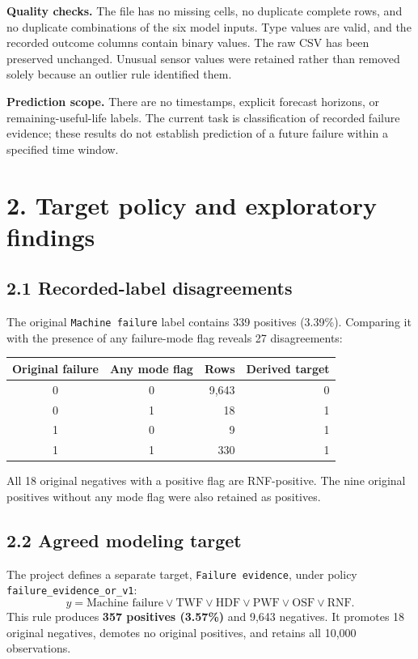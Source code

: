 \documentclass[11pt,a4paper]{article}
\newcommand{\filepath}[1]{\nolinkurl{#1}}
\newcommand{\pagetitle}[1]{\section*{#1}}
\begin{document}
\textbf{Quality checks.} The file has no missing cells, no duplicate complete
rows, and no duplicate combinations of the six model inputs. Type values are
valid, and the recorded outcome columns contain binary values. The raw CSV
has been preserved unchanged. Unusual sensor values were retained rather
than removed solely because an outlier rule identified them.

\textbf{Prediction scope.} There are no timestamps, explicit forecast horizons,
or remaining-useful-life labels. The current task is classification of recorded
failure evidence; these results do not establish prediction of a future failure
within a specified time window.

\newpage
\pagetitle{2. Target policy and exploratory findings}
\subsection*{2.1 Recorded-label disagreements}
The original \texttt{Machine failure} label contains 339 positives (3.39\%).
Comparing it with the presence of any failure-mode flag reveals 27 disagreements:

\begin{center}
\begin{tabular}{ccrr}
\toprule
Original failure & Any mode flag & Rows & Derived target \\
\midrule
0 & 0 & 9,643 & 0 \\
0 & 1 & 18 & 1 \\
1 & 0 & 9 & 1 \\
1 & 1 & 330 & 1 \\
\bottomrule
\end{tabular}
\end{center}

All 18 original negatives with a positive flag are RNF-positive. The nine
original positives without any mode flag were also retained as positives.

\subsection*{2.2 Agreed modeling target}
The project defines a separate target, \texttt{Failure evidence}, under policy
\filepath{failure_evidence_or_v1}:
\[
y = \text{Machine failure} \lor \text{TWF} \lor \text{HDF}
    \lor \text{PWF} \lor \text{OSF} \lor \text{RNF}.
\]
This rule produces \textbf{357 positives (3.57\%)} and 9,643 negatives. It
promotes 18 original negatives, demotes no original positives, and retains
all 10,000 observations.
\end{document}

